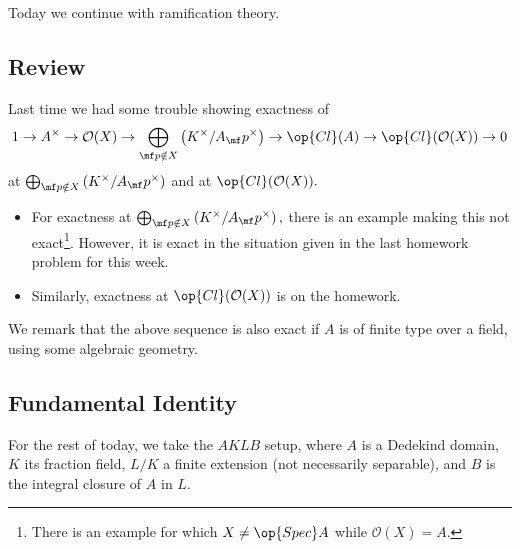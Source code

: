 













Today we continue with ramification theory.

\subsection{Review}
Last time we had some trouble showing exactness of
\[1\to A^\times\to\mathcal O(X)\to\bigoplus_{\mf p\notin X}\left(K^\times/A_\mf p^\times\right)\to\op{Cl}(A)\to\op{Cl}(\mathcal O(X))\to0\]
at $\bigoplus_{\mf p\notin X}\left(K^\times/A_\mf p^\times\right)$ and at $\op{Cl}(\mathcal O(X)).$
\begin{itemize}
	\item For exactness at $\bigoplus_{\mf p\notin X}\left(K^\times/A_\mf p^\times\right),$ there is an example making this not exact\footnote{There is an example for which $X\ne\op{Spec}A$ while $\mathcal O(X)=A.$}. However, it is exact in the situation given in the last homework problem for this week.
	\item Similarly, exactness at $\op{Cl}(\mathcal O(X))$ is on the homework.
\end{itemize}
We remark that the above sequence is also exact if $A$ is of finite type over a field, using some algebraic geometry.

\subsection{Fundamental Identity}
For the rest of today, we take the $AKLB$ setup, where $A$ is a Dedekind domain, $K$ its fraction field, $L/K$ a finite extension (not necessarily separable), and $B$ is the integral closure of $A$ in $L.$


